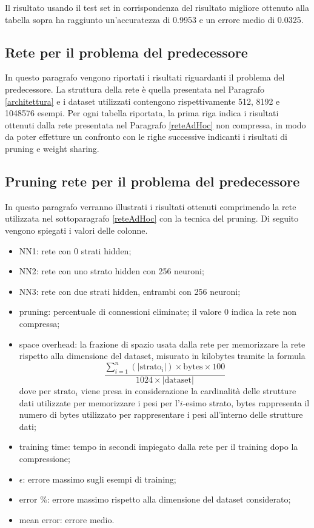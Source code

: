 \documentclass[12pt]{report}
\begin{document}
Il risultato usando il test set in corrispondenza del risultato migliore ottenuto alla tabella sopra ha raggiunto un'accuratezza di 0.9953 e un errore medio di 0.0325.

\newpage

\subsection{Rete per il problema del predecessore}
In questo paragrafo vengono riportati i risultati riguardanti il problema del predecessore.
La struttura della rete è quella presentata nel Paragrafo \ref{architettura} e i dataset utilizzati contengono rispettivamente 512, 8192 e 1048576 esempi.
Per ogni tabella riportata, la prima riga indica i risultati ottenuti dalla rete presentata nel Paragrafo \ref{reteAdHoc} non compressa, in modo da poter effetture un confronto con le righe successive indicanti i risultati di pruning e weight sharing.

\subsection{Pruning rete per il problema del predecessore} \label{CSRProblem}
In questo paragrafo verranno illustrati i risultati ottenuti comprimendo la rete utilizzata nel sottoparagrafo \ref{reteAdHoc} con la tecnica del pruning.
Di seguito vengono spiegati i valori delle colonne.
\begin{itemize}
\item{NN1}: rete con 0 strati hidden;
\item{NN2}: rete con uno strato hidden con 256 neuroni;
\item{NN3}: rete con due strati hidden, entrambi con 256 neuroni;
\item{pruning}: percentuale di connessioni eliminate; il valore 0 indica la rete non compressa;
\item{space overhead}: la frazione di spazio usata dalla rete per memorizzare la rete rispetto alla dimensione del dataset, misurato in kilobytes tramite la formula 
$$\displaystyle{\frac{\sum_{i=1}^n \left(|\mathrm{strato}_i|\right) \times \mathrm{bytes} \times 100}{1024 \times \left| \mathrm{dataset} \right|}}$$ dove per $\mathrm{strato}_i$ viene presa in considerazione la cardinalità delle strutture dati utilizzate per memorizzare i pesi per l'$i$-esimo strato, bytes rappresenta il numero di bytes utilizzato per rappresentare i pesi all'interno delle strutture dati;
\item{training time}: tempo in secondi impiegato dalla rete per il training dopo la compressione;
\item{$\epsilon$}: errore massimo sugli esempi di training;
\item{error \%}: errore massimo rispetto alla dimensione del dataset considerato;
\item{mean error}: errore medio.
\end{itemize}
\par\null\par
\par\null\par
\end{document}
